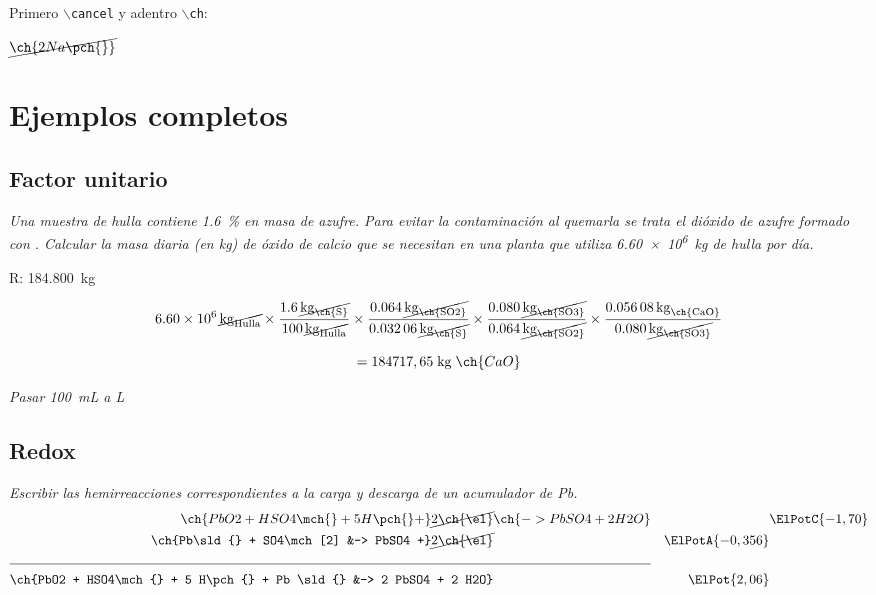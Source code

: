 \documentclass[10pt,a4paper]{article}
\begin{document}


\noindent Primero \texttt{$\backslash{}$cancel} y adentro \texttt{$\backslash{}$ch}:

$\cancel{\ch{2 Na\pch{}}}$

\section{Ejemplos completos}

\subsection{Factor unitario}
{\it Una muestra de hulla contiene \SI{1,6}{\percent} en masa de azufre. Para evitar la contaminación al quemarla se trata el dióxido de azufre formado con \si{\cal}. Calcular la masa diaria (en \si{\kg}) de óxido de calcio que se necesitan en una planta que utiliza \SI{6,60e6}{\kg} de hulla por día.}

R: \SI{184.800}{\kg}


\begin{equation*}
\SI{6.60e6}{\cancel\kilogram\of{Hulla}}\times\frac{\SI{1,6}{\cancel\kilogram\of{\ch{S}}}}{\SI{100}{\cancel\kilogram\of{Hulla}}}
\times\frac{\SI{0,064}{\cancel\kilogram\of{\ch{SO2}}}}{\SI{0,03206}{\cancel\kilogram\of{\ch{S}}}}
\times\frac{\SI{0,080}{\cancel\kilogram\of{\ch{SO3}}}}{\SI{0,064}{\cancel\kilogram\of{\ch{SO2}}}}
\times\frac{\SI{0,05608}{\kilogram\of{\ch{CaO}}}}{\SI{0,080}{\cancel\kilogram\of{\ch{SO3}}}}
\end{equation*}

\begin{equation*}
= 184717,65\;\si{\kilogram}\;\ch{CaO}
\end{equation*}

{\it Pasar \SI{100}{\milli\liter} a \si{\liter}}



\subsection{Redox}
{\it Escribir las hemirreacciones correspondientes a la carga y descarga de un acumulador de
Pb.} 
\begin{align*}
\ch{PbO2 + HSO4\mch{} + 5 H\pch{} +} \cancel{2 \ch{\el}} &\ch{-> PbSO4 + 2 H2O} &\quad&\ElPotC{-1,70} \\
\ch{Pb\sld{} + SO4\mch[2] &-> PbSO4 +} \cancel{2  \ch{\el}} &\quad&\ElPotA{-0,356} \\
\cline{1-2}
\ch{PbO2 + HSO4\mch{} + 5 H\pch{} + Pb \sld{} &-> 2 PbSO4 + 2 H2O} &\quad& \ElPot{2,06}
\end{align*}
	
\begin{reaction}
{}
\end{reaction}
\end{document}
